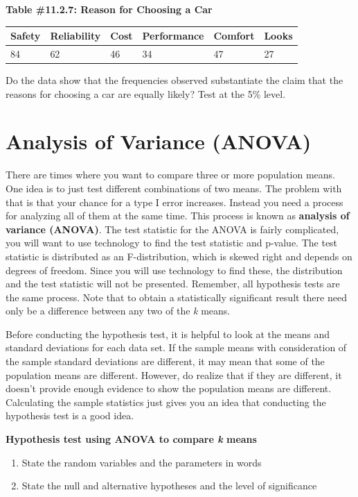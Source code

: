 \documentclass[
]{book}
\begin{document}
\textbf{Table \#11.2.7: Reason for Choosing a Car}

\begin{longtable}[]{@{}llllll@{}}
\toprule
Safety & Reliability & Cost & Performance & Comfort & Looks\tabularnewline
\midrule
\endhead
84 & 62 & 46 & 34 & 47 & 27\tabularnewline
\bottomrule
\end{longtable}

Do the data show that the frequencies observed substantiate the claim that the reasons for choosing a car are equally likely? Test at the 5\% level.
\textbf{\\
}

\hypertarget{analysis-of-variance-anova}{%
\section{Analysis of Variance (ANOVA)}\label{analysis-of-variance-anova}}

There are times where you want to compare three or more population means. One idea is to just test different combinations of two means. The problem with that is that your chance for a type I error increases. Instead you need a process for analyzing all of them at the same time. This process is known as \textbf{analysis of variance (ANOVA)}. The test statistic for the ANOVA is fairly complicated, you will want to use technology to find the test statistic and p-value. The test statistic is distributed as an F-distribution, which is skewed right and depends on degrees of freedom. Since you will use technology to find these, the distribution and the test statistic will not be presented. Remember, all hypothesis tests are the same process. Note that to obtain a statistically significant result there need only be a difference between any two of the \emph{k} means.

Before conducting the hypothesis test, it is helpful to look at the means and standard deviations for each data set. If the sample means with consideration of the sample standard deviations are different, it may mean that some of the population means are different. However, do realize that if they are different, it doesn't provide enough evidence to show the population means are different. Calculating the sample statistics just gives you an idea that conducting the hypothesis test is a good idea.

\textbf{Hypothesis test using ANOVA to compare \emph{k} means}

\begin{enumerate}
\def\labelenumi{\arabic{enumi}.}
\item
  State the random variables and the parameters in words
\item
  State the null and alternative hypotheses and the level of significance
\end{enumerate}
\end{document}
